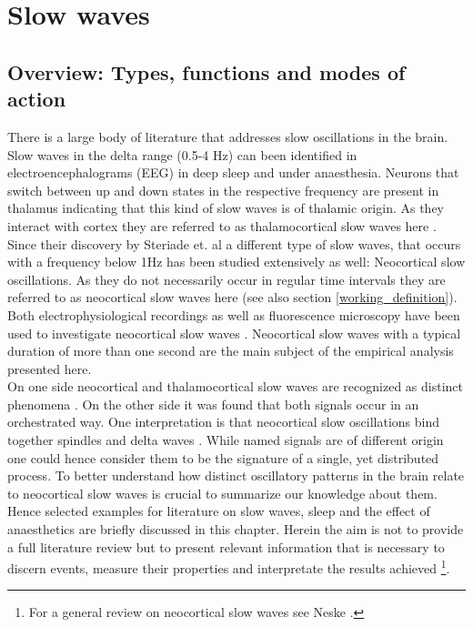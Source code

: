 
\chapter{Slow waves} %

\label{Chapter2} %
\label{review} %



\section{Overview: Types, functions and modes of action}
\label{overview_of_functions_and_types}
There is a large body of literature that addresses slow oscillations in the brain. Slow waves in the delta range (0.5-4 Hz) can been identified in electroencephalograms (EEG) in deep sleep and under anaesthesia. Neurons that switch between up and down states in the respective frequency are present in thalamus indicating that this kind of slow waves is of thalamic origin. As they interact with cortex they are referred to as thalamocortical slow waves here \parencite{steriade1984thalamus, brown2012control}. Since their discovery by Steriade et. al \parencite*{steriade1993novel} a different type of slow waves, that occurs with a frequency below 1Hz has been studied extensively as well: Neocortical slow oscillations. As they do not necessarily occur in regular time intervals they are referred to as neocortical slow waves here (see also section \ref{working_definition}). Both electrophysiological recordings as well as fluorescence microscopy have been used to investigate neocortical slow waves \parencite{niethard2018cortical, celotto2020analysis}. Neocortical slow waves with a typical duration of more than one second are the main subject of the empirical analysis presented here.\\
 On one side neocortical and thalamocortical slow waves are recognized as distinct phenomena \parencite[p. 1110]{brown2012control}. On the other side it was found that both signals occur in an orchestrated way. One interpretation is that neocortical slow oscillations bind together spindles and delta waves \parencite[p. 1110]{brown2012control}. While named signals are of different origin one could hence consider them to be the signature of a single, yet distributed process. To better understand how distinct oscillatory patterns in the brain relate to neocortical slow waves is crucial to summarize our knowledge about them. Hence selected examples for literature on slow waves, sleep and the effect of anaesthetics are briefly discussed in this chapter. Herein the aim is not to provide a full literature review but to present relevant information that is necessary to discern events, measure their properties and interpretate the results achieved \footnote{For a general review on neocortical slow waves see Neske \parencite*{neske2016slow}.}.\\
